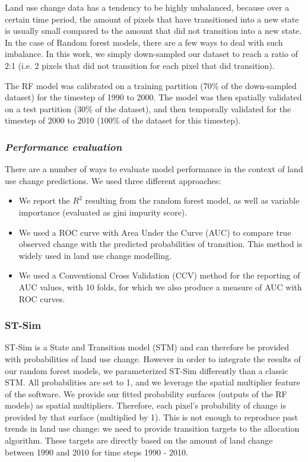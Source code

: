 Land use change data has a tendency to be highly unbalanced, because over a certain time period, the amount of pixels that have transitioned into a new state is usually small compared to the amount that did not transition into a new state. In the case of Random forest models, there are a few ways to deal with such imbalance. In this work, we simply down-sampled our dataset to reach a ratio of 2:1 (i.e. 2 pixels that did not transition for each pixel that did transition).

The RF model was calibrated on a training partition (70\% of the down-sampled dataset) for the timestep of 1990 to 2000. The model was then spatially validated on a test partition (30\% of the dataset), and then temporally validated for the timestep of 2000 to 2010 (100\% of the dataset for this timestep). \\

\subsubsection*{\textit{Performance evaluation}}

There are a number of ways to evaluate model performance in the context of land use change predictions. We used three different approaches:
\begin{itemize}
 \item We report the $R^{2}$ resulting from the random forest model, as well as variable importance (evaluated as gini impurity score).
 \item We used a ROC curve with Area Under the Curve (AUC) to compare true observed change with the predicted probabilities of transition. This method is widely used in land use change modelling. %
 \item We used a Conventional Cross Validation (CCV) method for the reporting of AUC values, with 10 folds, for which we also produce a measure of AUC with ROC curves.\\
\end{itemize}

\subsubsection*{ST-Sim}

ST-Sim \citep{daniel_state-and-transition_2016}  is a State and Transition model (STM) and can therefore be provided with probabilities of land use change. However in order to integrate the results of our random forest models, we parameterized ST-Sim differently than a classic STM. All probabilities are set to 1, and we leverage the spatial multiplier feature of the software. We provide our fitted probability surfaces (outputs of the RF models) as spatial multipliers. Therefore, each pixel's probability of change is provided by that surface (multiplied by 1).  This is not enough to reproduce past trends in land use change: we need to provide transition targets to the allocation algorithm. These targets are directly based on the amount of land change between 1990 and 2010 for time steps 1990 - 2010.\\

